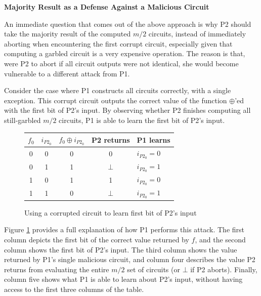 \noindent\textbf{Majority Result as a Defense Against a Malicious Circuit}

An immediate question that comes out of the above approach is why \ac{P2} should take the majority result of the computed $m/2$ circuits, instead of immediately aborting when encountering the first corrupt circuit, especially given that computing a garbled circuit is a very expensive operation.  The reason is that, were \ac{P2} to abort if all circuit outputs were not identical, she would become vulnerable to a different attack from \ac{P1}.

Consider the case where \ac{P1} constructs all circuits correctly, with a single exception.  This corrupt circuit outputs the correct value of the function $\oplus$'ed with the first bit of \ac{P2}'s input.  By observing whether \ac{P2} finishes computing all still-garbled $m/2$ circuits, \ac{P1} is able to learn the first bit of \ac{P2}'s input.

\begin{figure}[t]
    \centering
    \begin{tabular}{ c | c | c | c | l }
        \hline
        $f_0$ & $i_{P2_0}$ & $f_0 \oplus i_{P2_0}$ & \ac{P2} returns & \ac{P1} learns \\
        \hline
        0 & 0 & 0 & 0 & $i_{P2_0} = 0$\\
        \hline
        0 & 1 & 1 & $\bot$ & $i_{P2_0} = 1$\\
        \hline
        1 & 0 & 1 & 1 & $i_{P2_0} = 0$\\
        \hline
        1 & 1 & 0 & $\bot$ & $i_{P2_0} = 1$\\
        \hline
    \end{tabular}
    \caption{Using a corrupted circuit to learn first bit of \ac{P2}'s input}
    \label{fig:earlyabortattack}
\end{figure}

Figure \ref{fig:earlyabortattack} provides a full explanation of how \ac{P1} performs this attack.  The first column depicts the first bit of the correct value returned by $f$, and the second column shows the first bit of \ac{P2}'s input.  The third column shows the value returned by \ac{P1}'s single malicious circuit, and column four describes the value \ac{P2} returns from evaluating the entire $m/2$ set of circuits (or $\bot$ if \ac{P2} aborts).  Finally, column five shows what \ac{P1} is able to learn about \ac{P2}'s input, without having access to the first three columns of the table.


